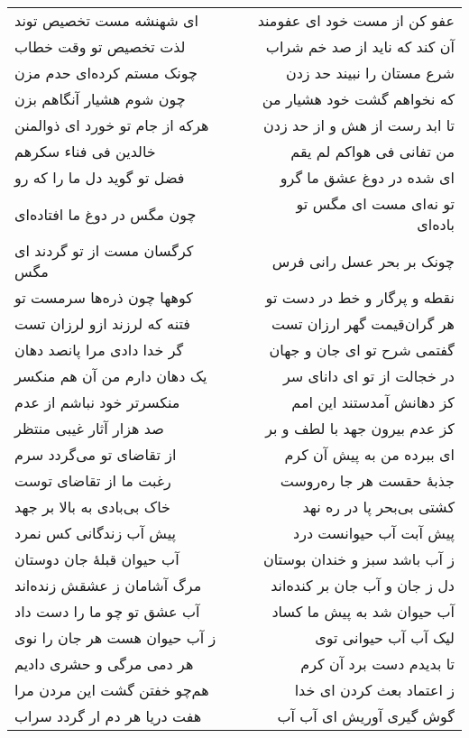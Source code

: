 \begin{center}
\begin{longtable}{l p{0.5cm} r}
\\
ای شهنشه مست تخصیص توند
&&
عفو کن از مست خود ای عفومند
\\
لذت تخصیص تو وقت خطاب
&&
آن کند که ناید از صد خم شراب
\\
چونک مستم کرده‌ای حدم مزن
&&
شرع مستان را نبیند حد زدن
\\
چون شوم هشیار آنگاهم بزن
&&
که نخواهم گشت خود هشیار من
\\
هرکه از جام تو خورد ای ذوالمنن
&&
تا ابد رست از هش و از حد زدن
\\
خالدین فی فناء سکرهم
&&
من تفانی فی هواکم لم یقم
\\
فضل تو گوید دل ما را که رو
&&
ای شده در دوغ عشق ما گرو
\\
چون مگس در دوغ ما افتاده‌ای
&&
تو نه‌ای مست ای مگس تو باده‌ای
\\
کرگسان مست از تو گردند ای مگس
&&
چونک بر بحر عسل رانی فرس
\\
کوهها چون ذره‌ها سرمست تو
&&
نقطه و پرگار و خط در دست تو
\\
فتنه که لرزند ازو لرزان تست
&&
هر گران‌قیمت گهر ارزان تست
\\
گر خدا دادی مرا پانصد دهان
&&
گفتمی شرح تو ای جان و جهان
\\
یک دهان دارم من آن هم منکسر
&&
در خجالت از تو ای دانای سر
\\
منکسرتر خود نباشم از عدم
&&
کز دهانش آمدستند این امم
\\
صد هزار آثار غیبی منتظر
&&
کز عدم بیرون جهد با لطف و بر
\\
از تقاضای تو می‌گردد سرم
&&
ای ببرده من به پیش آن کرم
\\
رغبت ما از تقاضای توست
&&
جذبهٔ حقست هر جا ره‌روست
\\
خاک بی‌بادی به بالا بر جهد
&&
کشتی بی‌بحر پا در ره نهد
\\
پیش آب زندگانی کس نمرد
&&
پیش آبت آب حیوانست درد
\\
آب حیوان قبلهٔ جان دوستان
&&
ز آب باشد سبز و خندان بوستان
\\
مرگ آشامان ز عشقش زنده‌اند
&&
دل ز جان و آب جان بر کنده‌اند
\\
آب عشق تو چو ما را دست داد
&&
آب حیوان شد به پیش ما کساد
\\
ز آب حیوان هست هر جان را نوی
&&
لیک آب آب حیوانی توی
\\
هر دمی مرگی و حشری دادیم
&&
تا بدیدم دست برد آن کرم
\\
هم‌چو خفتن گشت این مردن مرا
&&
ز اعتماد بعث کردن ای خدا
\\
هفت دریا هر دم ار گردد سراب
&&
گوش گیری آوریش ای آب آب
\\

\end{longtable}
\end{center}
